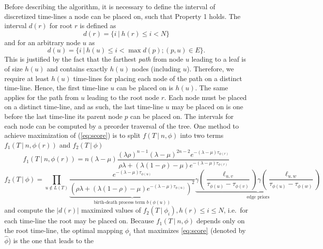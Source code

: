\documentclass{llncs}
\begin{document}
Before describing the algorithm, it is necessary to define the interval of
discretized time-lines a node can be placed on, such that Property 1 holds. The
interval $d(r)$ for root $r$ is defined as $$d(r) = \{ i\ |\ h(r) \leq i <
N\}$$ and for an arbitrary node $u$ as $$d(u) = \{ i\ |\ h(u) \leq i < \max
d(p); (p,u) \in E\}.$$ This is justified by the fact that the farthest {\em
path} from node $u$ leading to a leaf is of size $h(u)$ and contains exactly
$h(u)$ nodes (including $u$).  Therefore, we require at least $h(u)$ time-lines
for placing each node of the path on a distinct time-line.  Hence, the first
time-line $u$ can be placed on is $h(u)$. The same applies for the path from
$u$ leading to the root node $r$.  Each node must be placed on a distinct
time-line, and as such, the last time-line $u$ may be placed on is one before
the last time-line its parent node $p$ can be placed on. The intervals for each
node can be computed by a preorder traversal of the tree. One method to achieve
maximization of (\ref{eq:score}) is to split $f(T\ |\ n, \phi)$ into two terms
$f_1(T\ |\ n,\phi(r))$ and $f_2(T\ |\ \phi)$
%
%
\begin{equation}\label{eq:part1} 
f_1(T\ |\ n,\phi(r)) = n (\lambda-\mu)
                       \frac{(\lambda\rho)^{n-1}%
                             (\lambda-\mu)^{2n-2}%
                             e^{-(\lambda-\mu)\tau_{\phi(r)}}}%
                            {\rho\lambda +%
                             (\lambda(1 -\rho)-\mu)%
                             e^{-(\lambda-\mu)\tau_{\phi(r)}}}
\end{equation}
%
%
\begin{equation}\label{eq:part2}
f_2(T\ |\ \phi) = \prod_{u\notin L(T)}
                  \underbrace{
                    \frac{e^{-(\lambda-\mu)\tau_{\phi(u)}}}
                         {(\rho\lambda + 
                          (\lambda(1-\rho)-\mu)
                          e^{-(\lambda-\mu)\tau_{\phi(u)}})^2}
                  }_{\textrm{birth-death process term } b(\phi(u))}
                  \underbrace{
                    \gamma(\frac{\ell_{u,v}}{\tau_{\phi(u)}-\tau_{\phi(v)}})
                    \gamma(\frac{\ell_{u,w}}{\tau_{\phi(u)}-\tau_{\phi(w)}})
                  }_{\textrm{edge priors}}
\end{equation}
%
%
and compute the $|d(r)|$ maximized values of $f_2(T\ |\ \phi_i), h(r) \leq i
\leq N$, i.e.\ for each time-line the root may be placed on. Because $f_1(T\ |\
n,\phi)$ depends only on the root time-line, the optimal mapping $\phi_i$ that
maximizes \ref{eq:score} (denoted by $\hat\phi$) is the one that leads to the
\end{document}
